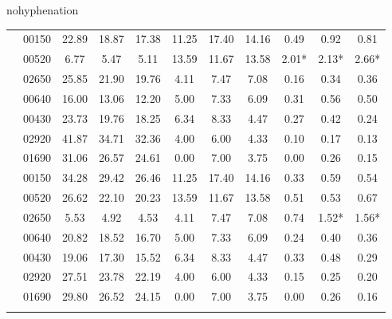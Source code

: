 \begin{hyphenrules}{nohyphenation}
\begin{table}[H]
{\begin{tabular}{>{\raggedleft\arraybackslash}p{4cm} lccCccCccc}
             & 00150 & 22.89 & 18.87 & 17.38 & 11.25 & 17.40 & 14.16 & 0.49 & 0.92 & 0.81 \\
            & 00520 &                       6.77 & 5.47 & 5.11 &        13.59 & 11.67 & 13.58 & 2.01* & 2.13* & 2.66* \\
            & 02650 &                       25.85 & 21.90 & 19.76 &     4.11 & 7.47 & 7.08 &    0.16 & 0.34 & 0.36 \\
            & 00640 &                       16.00 & 13.06 & 12.20 &     5.00 & 7.33 & 6.09 &    0.31 & 0.56 & 0.50 \\
            & 00430 &                       23.73 & 19.76 & 18.25 &     6.34 & 8.33 & 4.47 &    0.27 & 0.42 & 0.24 \\
            & 02920 &                       41.87 & 34.71 & 32.36 &     4.00 & 6.00 & 4.33 &    0.10 & 0.17 & 0.13 \\
            & 01690 &                       31.06 & 26.57 & 24.61 &     0.00 & 7.00 & 3.75 &    0.00 & 0.26 & 0.15 \\
            \midrule
            
             & 00150 & 34.28 & 29.42 & 26.46 & 11.25 & 17.40 & 14.16 & 0.33 & 0.59 & 0.54 \\
            & 00520 &                       26.62 & 22.10 & 20.23 &     13.59 & 11.67 & 13.58 & 0.51 & 0.53 & 0.67 \\
            & 02650 &                       5.53 & 4.92 & 4.53 &        4.11 & 7.47 & 7.08 &    0.74 & 1.52* & 1.56* \\
            & 00640 &                       20.82 & 18.52 & 16.70 &     5.00 & 7.33 & 6.09 &    0.24 & 0.40 & 0.36 \\
            & 00430 &                       19.06 & 17.30 & 15.52 &     6.34 & 8.33 & 4.47 &    0.33 & 0.48 & 0.29 \\
            & 02920 &                       27.51 & 23.78 & 22.19 &     4.00 & 6.00 & 4.33 &    0.15 & 0.25 & 0.20 \\
            & 01690 &                       29.80 & 26.52 & 24.15 &     0.00 & 7.00 & 3.75 &    0.00 & 0.26 & 0.16 \\
            \midrule
            

\end{tabular}}
\end{table}
\end{hyphenrules}
